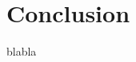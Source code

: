 \documentclass[
	a4paper, %
	10pt, %
]{CSUniSchoolLabReport}
\begin{document}
\section{Conclusion}

blabla


\printbibliography %

\end{document}
